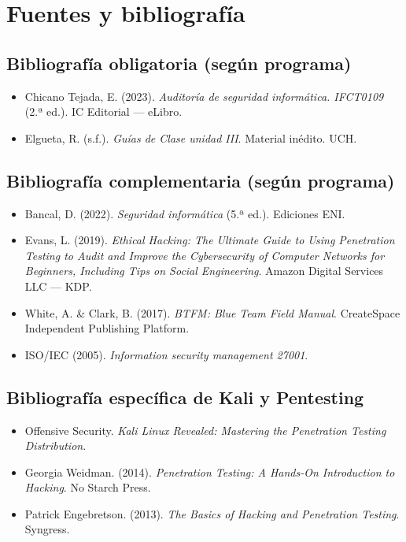 \documentclass[11pt,a4paper]{article}
\begin{document}
\section{Fuentes y bibliografía}

\subsection{Bibliografía obligatoria (según programa)}
\begin{itemize}[leftmargin=*]
  \item Chicano Tejada, E. (2023). \textit{Auditoría de seguridad informática. IFCT0109} (2.ª ed.). IC Editorial --- eLibro.
  \item Elgueta, R. (s.f.). \textit{Guías de Clase unidad III}. Material inédito. UCH.
\end{itemize}

\subsection{Bibliografía complementaria (según programa)}
\begin{itemize}[leftmargin=*]
  \item Bancal, D. (2022). \textit{Seguridad informática} (5.ª ed.). Ediciones ENI.
  \item Evans, L. (2019). \textit{Ethical Hacking: The Ultimate Guide to Using Penetration Testing to Audit and Improve the Cybersecurity of Computer Networks for Beginners, Including Tips on Social Engineering}. Amazon Digital Services LLC --- KDP.
  \item White, A. \& Clark, B. (2017). \textit{BTFM: Blue Team Field Manual}. CreateSpace Independent Publishing Platform.
  \item ISO/IEC (2005). \textit{Information security management 27001}.
\end{itemize}

\subsection{Bibliografía específica de Kali y Pentesting}
\begin{itemize}[leftmargin=*]
  \item Offensive Security. \textit{Kali Linux Revealed: Mastering the Penetration Testing Distribution}.
  \item Georgia Weidman. (2014). \textit{Penetration Testing: A Hands-On Introduction to Hacking}. No Starch Press.
  \item Patrick Engebretson. (2013). \textit{The Basics of Hacking and Penetration Testing}. Syngress.
\end{itemize}
\end{document}
